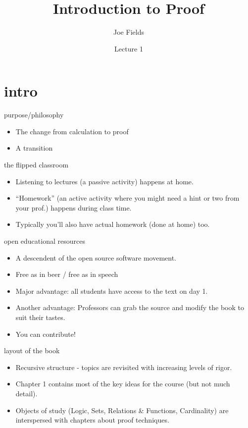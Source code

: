 \documentclass[landscape]{beamer}
\author{Joe Fields}
\title{Introduction to Proof}
\date{Lecture 1}
\institute[SCSU]{ {\tt fieldsj1@southernct.edu} }
\begin{document}
\begin{frame}[plain]
  \titlepage
\end{frame}

\section{intro}

\begin{frame}{purpose/philosophy}
\begin{itemize}
\item The change from calculation to proof\pause
\item A transition \textellipsis
\end{itemize}
\end{frame}

\begin{frame}{the flipped classroom}
\begin{itemize}
\item Listening to lectures (a passive activity) happens at home. \pause
\item ``Homework'' (an active activity where you might need a hint or two from your prof.) happens during class time. \pause 
\item Typically you'll also have actual homework (done at home) too. \pause
\end{itemize}
\end{frame}

\begin{frame}{open educational resources}
\begin{itemize}
\item A descendent of the open source software movement.\pause
\item Free as in beer / free as in speech \pause
\item Major advantage: all students have access to the text on day 1. \pause
\item Another advantage: Professors can grab the source and modify the book to suit their tastes.\pause
\item You can contribute! 
\end{itemize}
\end{frame}

\begin{frame}{layout of the book}
\begin{itemize}
\item Recursive structure - topics are revisited with increasing levels of rigor. \pause
\item Chapter 1 contains most of the key ideas for the course (but not much detail). \pause
\item Objects of study (Logic, Sets, Relations \& Functions, Cardinality) are interspersed with chapters about proof techniques. 
\end{itemize}
\end{frame}
\end{document}
